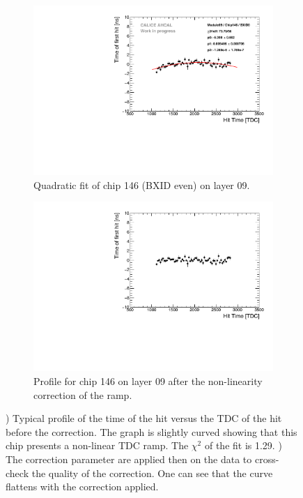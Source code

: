 \begin{figure}[htbp!]
	\begin{subfigure}[t]{0.45\textwidth}
		\centering
		\includegraphics[width=1\textwidth]{chap5/fig_AHCAL_timing/Muons/LinearityCorrection_Module09_Chip146_BXID0.pdf}
		\caption{Quadratic fit of chip 146 (BXID even) on layer 09.}\label{fig:LinCorr}
	\end{subfigure}
	\hfill
	\begin{subfigure}[t]{0.45\textwidth}
		\centering
		\includegraphics[width=1\textwidth]{chap5/fig_AHCAL_timing/Muons/LinearityCorrection_Module09_Chip146_BXID0_Corrected.pdf}
		\caption{Profile for chip 146 on layer 09 after the non-linearity correction of the ramp.}\label{fig:LinCorr_2}
	\end{subfigure}
	\caption{) Typical profile of the time of the hit versus the TDC of the hit before the correction. The graph is slightly curved showing that this chip presents a non-linear TDC ramp. The $\chi^2$ of the fit is 1.29. ) The correction parameter are applied then on the data to cross-check the quality of the correction. One can see that the curve flattens with the correction applied.}
\end{figure}

